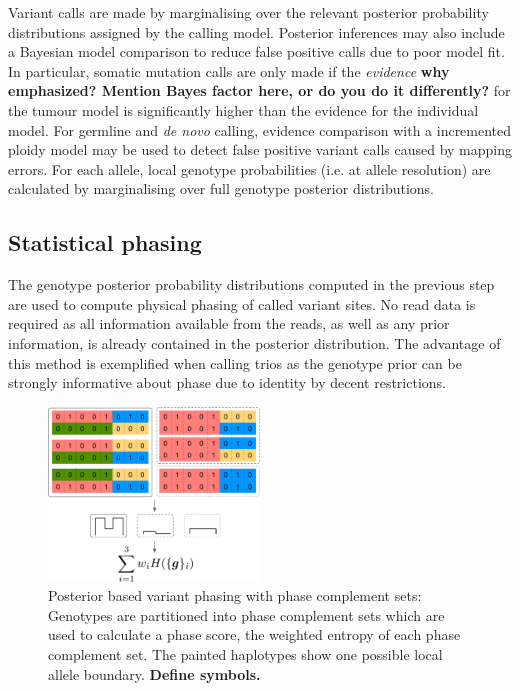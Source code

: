 \documentclass[notitlepage, twocolumn]{article}
\begin{document}
Variant calls are made by marginalising over the relevant posterior probability distributions assigned by the calling model. Posterior inferences may also include a Bayesian model comparison to reduce false positive calls due to poor model fit. In particular, somatic mutation calls are only made if the \emph{evidence} {\bf why emphasized?  Mention Bayes factor here, or do you do it differently?} for the tumour model is significantly higher than the evidence for the individual model. For germline and \textit{de novo} calling, evidence comparison with a incremented ploidy model may be used to detect false positive variant calls caused by mapping errors. For each allele, local genotype probabilities (i.e. at allele resolution) are calculated by marginalising over full genotype posterior distributions.

\subsection*{Statistical phasing}

The genotype posterior probability distributions computed in the previous step are used to compute physical phasing of called variant sites. No read data is required as all information available from the reads, as well as any prior information, is already contained in the posterior distribution. The advantage of this method is exemplified when calling trios as the genotype prior can be strongly informative about phase due to identity by decent restrictions.

\begin{figure}[ht]
\centering
\includegraphics[width=0.5\textwidth]{figures/phasing}
\caption{Posterior based variant phasing with phase complement sets: Genotypes are partitioned into phase complement sets which are used to calculate a phase score, the weighted entropy of each phase complement set. The painted haplotypes show one possible local allele boundary. {\bf Define symbols.}}
\label{fig:phasing}
\vspace{-1.5em}
\end{figure}
\end{document}
